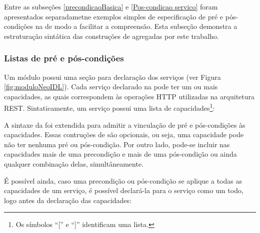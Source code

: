 Entre as subseções \ref{precondicaoBasica} e \ref{Pos-condicao servico} foram
apresentados separadametne exemplos simples de especificação de pré e
pós-condições na \neoidl{} de modo a facilitar a compreensão. Esta subseção
demonstra a estruturação sintática das construções de \designbycontract{} agregadas \neoidl{} por este trabalho.

\subsubsection{Listas de pré e pós-condições}

Um módulo \neoidl{} possui uma seção para declaração dos serviços (ver Figura
\ref{fig:moduloNeoIDL}). Cada serviço declarado na \neoidl{} pode ter um ou mais
capacidades, as quais correspondem às operações HTTP utilizadas na arquitetura
REST. Sintaticamente, um serviço possui uma lista de capacidades\footnote{Os
símbolos ``['' e ``]'' identificam uma lista.}:

\begin{center}
\begin{footnotesize}
\end{footnotesize}
\end{center}

A sintaxe da \neoidl{} foi extendida para admitir a vinculação de pré e
pós-condições às capacidades. Essas contruções de \designbycontract{} são
opcionais, ou seja, uma capacidade pode não ter nenhuma pré ou pós-condição. Por
outro lado, pode-se incluir nas capacidades mais de uma precondição e mais de
uma pós-condição ou ainda qualquer combinação delas, simultâneamente.

\begin{center}
\begin{footnotesize}
\end{footnotesize}
\end{center}

É possível ainda, caso uma precondição ou pós-condição se aplique a todas as
capacidades de um serviço, é possível declará-la para o serviço como um todo,
logo antes da declaração das capacidades:

\begin{center}
\begin{footnotesize}
\end{footnotesize}
\end{center}

